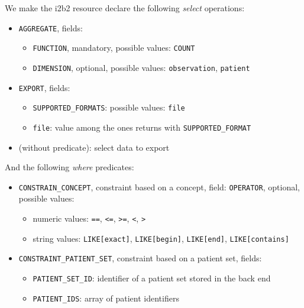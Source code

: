 We make the i2b2 resource declare the following \emph{select} operations:
\begin{itemize}
    \item \verb|AGGREGATE|, fields:
    \begin{itemize}
        \item \verb|FUNCTION|, mandatory, possible values:
        \verb|COUNT|
        
        \item \verb|DIMENSION|, optional, possible values:
        \verb|observation|,
        \verb|patient|
    \end{itemize}
    
    \item \verb|EXPORT|, fields:
    \begin{itemize}
        \item \verb|SUPPORTED_FORMATS|: possible values: \verb|file| %
        \item \verb|file|: value among the ones returns with \verb|SUPPORTED_FORMAT|
    \end{itemize}
    
    \item (without predicate): select data to export
\end{itemize}

And the following \emph{where} predicates:
\begin{itemize}
    \item \verb|CONSTRAIN_CONCEPT|, constraint based on a concept, field:
    \verb|OPERATOR|, optional, possible values:
    \begin{itemize}
        \item numeric values: \verb|==|, \verb|<=|, \verb|>=|, \verb|<|, \verb|>|
        \item string values: \verb|LIKE[exact]|, \verb|LIKE[begin]|, \verb|LIKE[end]|, \verb|LIKE[contains]|
    \end{itemize}
    
    \item \verb|CONSTRAINT_PATIENT_SET|, constraint based on a patient set, fields:
    \begin{itemize}
        \item \verb|PATIENT_SET_ID|: identifier of a patient set stored in the back end
        \item \verb|PATIENT_IDS|: array of patient identifiers
    \end{itemize}
\end{itemize}


